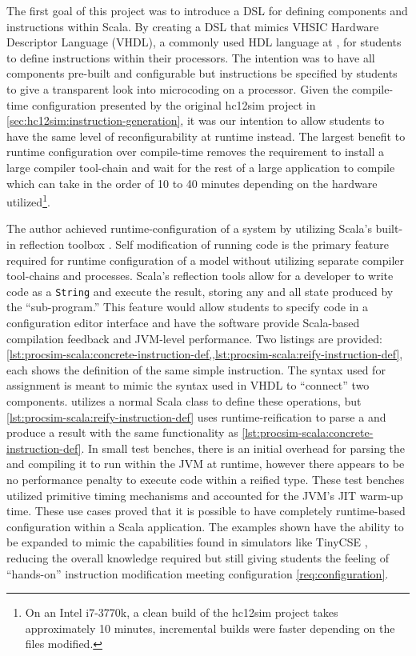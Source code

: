 The first goal of this project was to introduce a DSL for defining components and instructions within Scala. By creating a DSL that mimics VHSIC Hardware Descriptor Language (VHDL), a commonly used HDL language at \uwo{}, for students to define instructions within their processors. The intention was to have all components pre-built and configurable but instructions be specified by students to give a transparent look into microcoding on a processor. Given the compile-time configuration presented by the original hc12sim project in \cref{sec:hc12sim:instruction-generation}, it was our intention to allow students to have the same level of reconfigurability at runtime instead. The largest benefit to runtime configuration over compile-time removes the requirement to install a large compiler tool-chain and wait for the rest of a large application to compile which can take in the order of 10 to 40 minutes depending on the hardware utilized\footnote{On an Intel\textregistered{} i7-3770k, a clean build of the hc12sim project takes approximately 10 minutes, incremental builds were faster depending on the files modified.}. 

The author achieved runtime-configuration of a system by utilizing Scala's built-in reflection toolbox \cite{Scala-Reflection}.  Self modification of running code is the primary feature required for runtime configuration of a model without utilizing separate compiler tool-chains and processes. Scala's reflection tools allow for a developer to write code as a \texttt{String} and execute the result, storing any and all state produced by the ``sub-program.'' This feature would allow students to specify code in a configuration editor interface and have the software provide Scala-based compilation feedback and JVM-level performance. Two listings are provided: \cref{lst:procsim-scala:concrete-instruction-def,,lst:procsim-scala:reify-instruction-def}, each shows the definition of the same simple instruction. The syntax used for assignment is meant to mimic the syntax used in VHDL to ``connect'' two components.  utilizes a normal Scala class to define these operations, but \cref{lst:procsim-scala:reify-instruction-def} uses runtime-reification to parse a  and produce a result with the same functionality as \cref{lst:procsim-scala:concrete-instruction-def}. In small test benches, there is an initial overhead for parsing the  and compiling it to run within the JVM at runtime, however there appears to be no performance penalty to execute code within a reified type. These test benches utilized primitive timing mechanisms and accounted for the JVM's JIT warm-up time. These use cases proved that it is possible to have completely runtime-based configuration within a Scala application. The examples shown have the ability to be expanded to mimic the capabilities found in simulators like TinyCSE \cite{Nakamura2013, McLoughlin2010}, reducing the overall knowledge required but still giving students the feeling of ``hands-on'' instruction modification meeting configuration \cref{req:configuration}.

